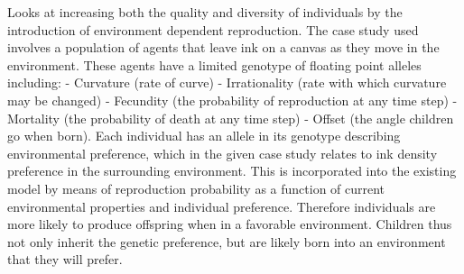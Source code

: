 \documentclass[10pt,a4paper]{article}
\begin{document}
Looks at increasing both the quality and diversity of individuals by the introduction of environment dependent reproduction.
The case study used involves a population of agents that leave ink on a canvas as they move in the environment.
These agents have a limited genotype of floating point alleles including: 
- Curvature (rate of curve)
- Irrationality (rate with which curvature may be changed)
- Fecundity (the probability of reproduction at any time step)
- Mortality (the probability of death at any time step)
- Offset (the angle children go when born).
Each individual has an allele in its genotype describing environmental preference, which in the given case study relates to ink density preference in the surrounding environment.
This is incorporated into the existing model by means of reproduction probability as a function of current environmental properties and individual preference.
Therefore individuals are more likely to produce offspring when in a favorable environment. 
Children thus not only inherit the genetic preference, but are likely born into an environment that they will prefer.


\pagebreak
\end{document}
